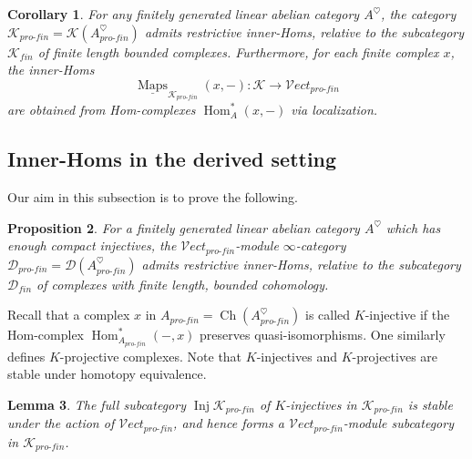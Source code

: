 \documentclass[reqno]{amsart}
\newtheorem{lemma}{Lemma}[section]
\newtheorem{proposition}[lemma]{Proposition}
\newtheorem{corollary}[lemma]{Corollary}
\theoremstyle{definition}
\newcommand{\msc}[1]{\mathscr{#1}}
\newcommand{\opn}[1]{\operatorname{#1}}
\newcommand{\Vect}{\msc{V}\!ect}
\newcommand{\pf}{pro\text{-}fin}
\DeclareMathOperator{\Hom}{Hom}
\DeclareMathOperator{\Maps}{Maps}
\renewcommand{\1}{\mathbf{1}}
\begin{document}
\begin{corollary}\label{cor:K_innerhoms}
For any finitely generated linear abelian category $A^{\heartsuit}$, the category $\msc{K}_{\pf}=\msc{K}(A^{\heartsuit}_{\pf})$ admits restrictive inner-Homs, relative to the subcategory $\msc{K}_{fin}$ of finite length bounded complexes.  Furthermore, for each finite complex $x$, the inner-Homs
\[
\underline{\Maps}_{\msc{K}_{\pf}}(x,-):\msc{K}\to \Vect_{\pf}
\]
are obtained from Hom-complexes $\Hom^{\ast}_{A}(x,-)$ via localization.
\end{corollary}

\subsection{Inner-Homs in the derived setting}

Our aim in this subsection is to prove the following.

\begin{proposition}\label{prop:D_innerhom}
For a finitely generated linear abelian category $A^{\heartsuit}$ which has enough compact injectives, the $\Vect_{\pf}$-module $\infty$-category $\msc{D}_{\pf}=\msc{D}(A^{\heartsuit}_{\pf})$ admits restrictive inner-Homs, relative to the subcategory $\msc{D}_{fin}$ of complexes with finite length, bounded cohomology.
\end{proposition}

Recall that a complex $x$ in $A_{\pf}=\opn{Ch}(A^{\heartsuit}_{\pf})$ is called $K$-injective if the Hom-complex $\Hom^{\ast}_{A_{\pf}}(-,x)$ preserves quasi-isomorphisms.  One similarly defines $K$-projective complexes.  Note that $K$-injectives and $K$-projectives are stable under homotopy equivalence.

\begin{lemma}\label{lem:inj_linear}
The full subcategory $\opn{Inj}\msc{K}_{\pf}$ of $K$-injectives in $\msc{K}_{\pf}$ is stable under the action of $\Vect_{\pf}$, and hence forms a $\Vect_{\pf}$-module subcategory in $\msc{K}_{\pf}$.
\end{lemma}
\end{document}
